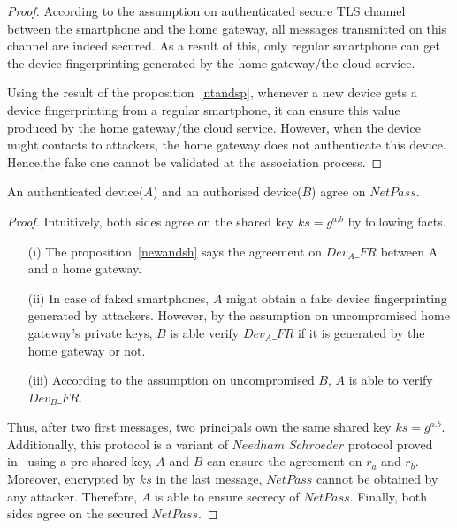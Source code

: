 \begin{proof}

According to the assumption on authenticated secure TLS channel between the smartphone and the home gateway,  all messages transmitted on this channel are indeed secured. As a result of this, only regular smartphone can get the device fingerprinting generated by the home gateway/the cloud service. 

Using the result of the proposition~\ref{ntandsp}, whenever a new device gets a device fingerprinting from a regular smartphone, it can ensure this value produced by the home gateway/the cloud service. However, when the device might contacts to attackers, the home gateway does not authenticate this device. Hence,the fake one cannot be validated at the association process. 

\end{proof}

\begin{Proposition}
An authenticated device($A$) and an authorised device($B$) agree on $NetPass$. 
\end{Proposition}

\begin{proof}

Intuitively, both sides agree on the shared key $ks = g^{a.b}$ by following facts. 
\begin{enumerate}
\item [(i)] The proposition~\ref{newandsh} says the agreement on $Dev_{A}\_FR$ between A and a home gateway.
\item [(ii)] In case of faked smartphones, $A$ might obtain a fake device fingerprinting generated by attackers. However, by the assumption on uncompromised home gateway's private keys, $B$ is able verify $Dev_{A}\_FR$ if it is generated by the home gateway or not. 
\item [(iii)] According to the assumption on uncompromised $B$, $A$ is able to verify $Dev_{B}\_FR$. 
\end{enumerate}

Thus, after two first messages, two principals own the same shared key $ks = g^{a.b}$. Additionally, this protocol is a variant of $Needham$ $Schroeder$ protocol proved in~\cite{674832} using a pre-shared key, $A$ and $B$ can ensure the agreement on $r_a$ and $r_b$. 
Moreover, encrypted by $ks$ in the last message, $NetPass$ cannot be obtained by any attacker. Therefore, $A$ is able to ensure secrecy of $NetPass$. Finally, both sides agree on the secured $NetPass$. 
\end{proof}

